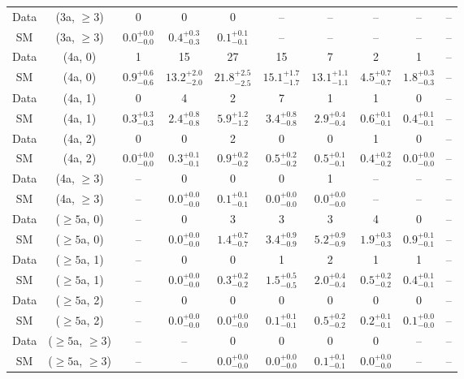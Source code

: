 \begin{table}[h!]
{\begin{tabular}{cccccccccc}
	Data & (3a, $\ge3$) & 0 & 0 & 0 & -- & -- & -- & -- & -- \\[0.5ex] 
	SM & (3a, $\ge3$) & $0.0^{+ 0.0 }_{- 0.0 }$ & $0.4^{+ 0.3 }_{- 0.3 }$ & $0.1^{+ 0.1 }_{- 0.1 }$ & -- & -- & -- & -- & -- \\[0.5ex] 
	Data & (4a, 0) & 1 & 15 & 27 & 15 & 7 & 2 & 1 & -- \\[0.5ex] 
	SM & (4a, 0) & $0.9^{+ 0.6 }_{- 0.6 }$ & $13.2^{+ 2.0 }_{- 2.0 }$ & $21.8^{+ 2.5 }_{- 2.5 }$ & $15.1^{+ 1.7 }_{- 1.7 }$ & $13.1^{+ 1.1 }_{- 1.1 }$ & $4.5^{+ 0.7 }_{- 0.7 }$ & $1.8^{+ 0.3 }_{- 0.3 }$ & -- \\[0.5ex] 
	Data & (4a, 1) & 0 & 4 & 2 & 7 & 1 & 1 & 0 & -- \\[0.5ex] 
	SM & (4a, 1) & $0.3^{+ 0.3 }_{- 0.3 }$ & $2.4^{+ 0.8 }_{- 0.8 }$ & $5.9^{+ 1.2 }_{- 1.2 }$ & $3.4^{+ 0.8 }_{- 0.8 }$ & $2.9^{+ 0.4 }_{- 0.4 }$ & $0.6^{+ 0.1 }_{- 0.1 }$ & $0.4^{+ 0.1 }_{- 0.1 }$ & -- \\[0.5ex] 
	Data & (4a, 2) & 0 & 0 & 2 & 0 & 0 & 1 & 0 & -- \\[0.5ex] 
	SM & (4a, 2) & $0.0^{+ 0.0 }_{- 0.0 }$ & $0.3^{+ 0.1 }_{- 0.1 }$ & $0.9^{+ 0.2 }_{- 0.2 }$ & $0.5^{+ 0.2 }_{- 0.2 }$ & $0.5^{+ 0.1 }_{- 0.1 }$ & $0.4^{+ 0.2 }_{- 0.2 }$ & $0.0^{+ 0.0 }_{- 0.0 }$ & -- \\[0.5ex] 
	Data & (4a, $\ge3$) & -- & 0 & 0 & 0 & 1 & -- & -- & -- \\[0.5ex] 
	SM & (4a, $\ge3$) & -- & $0.0^{+ 0.0 }_{- 0.0 }$ & $0.1^{+ 0.1 }_{- 0.1 }$ & $0.0^{+ 0.0 }_{- 0.0 }$ & $0.0^{+ 0.0 }_{- 0.0 }$ & -- & -- & -- \\[0.5ex] 
	Data & ($\ge5$a, 0) & -- & 0 & 3 & 3 & 3 & 4 & 0 & -- \\[0.5ex] 
	SM & ($\ge5$a, 0) & -- & $0.0^{+ 0.0 }_{- 0.0 }$ & $1.4^{+ 0.7 }_{- 0.7 }$ & $3.4^{+ 0.9 }_{- 0.9 }$ & $5.2^{+ 0.9 }_{- 0.9 }$ & $1.9^{+ 0.3 }_{- 0.3 }$ & $0.9^{+ 0.1 }_{- 0.1 }$ & -- \\[0.5ex] 
	Data & ($\ge5$a, 1) & -- & 0 & 0 & 1 & 2 & 1 & 1 & -- \\[0.5ex] 
	SM & ($\ge5$a, 1) & -- & $0.0^{+ 0.0 }_{- 0.0 }$ & $0.3^{+ 0.2 }_{- 0.2 }$ & $1.5^{+ 0.5 }_{- 0.5 }$ & $2.0^{+ 0.4 }_{- 0.4 }$ & $0.5^{+ 0.2 }_{- 0.2 }$ & $0.4^{+ 0.1 }_{- 0.1 }$ & -- \\[0.5ex] 
	Data & ($\ge5$a, 2) & -- & 0 & 0 & 0 & 0 & 0 & 0 & -- \\[0.5ex] 
	SM & ($\ge5$a, 2) & -- & $0.0^{+ 0.0 }_{- 0.0 }$ & $0.0^{+ 0.0 }_{- 0.0 }$ & $0.1^{+ 0.1 }_{- 0.1 }$ & $0.5^{+ 0.2 }_{- 0.2 }$ & $0.2^{+ 0.1 }_{- 0.1 }$ & $0.1^{+ 0.0 }_{- 0.0 }$ & -- \\[0.5ex] 
	Data & ($\ge5$a, $\ge3$) & -- & -- & 0 & 0 & 0 & 0 & -- & -- \\[0.5ex] 
	SM & ($\ge5$a, $\ge3$) & -- & -- & $0.0^{+ 0.0 }_{- 0.0 }$ & $0.0^{+ 0.0 }_{- 0.0 }$ & $0.1^{+ 0.1 }_{- 0.1 }$ & $0.0^{+ 0.0 }_{- 0.0 }$ & -- & -- \\[0.5ex] 
	\hline
	\hline
\end{tabular}}
\end{table}
